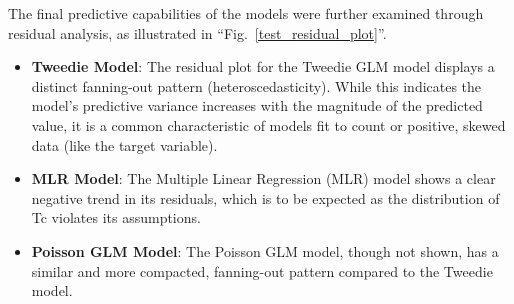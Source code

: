 \documentclass[conference]{IEEEtran}
\begin{document}
The final predictive capabilities of the models were further examined through residual analysis, as illustrated in ``Fig.~\ref{test_residual_plot}''.
\begin{itemize}
	\item \textbf{Tweedie Model}: The residual plot for the Tweedie GLM model displays a distinct fanning-out pattern (heteroscedasticity). While this indicates the model's predictive variance increases with the magnitude of the predicted value, it is a common characteristic of models fit to count or positive, skewed data (like the target variable).
	\item \textbf{MLR Model}: The Multiple Linear Regression (MLR) model shows a clear negative trend in its residuals, which is to be expected as the distribution of Tc violates its assumptions.
	\item \textbf{Poisson GLM Model}: The Poisson GLM model, though not shown, has a similar and more compacted, fanning-out pattern compared to the Tweedie model.\\
\end{itemize}
\end{document}
